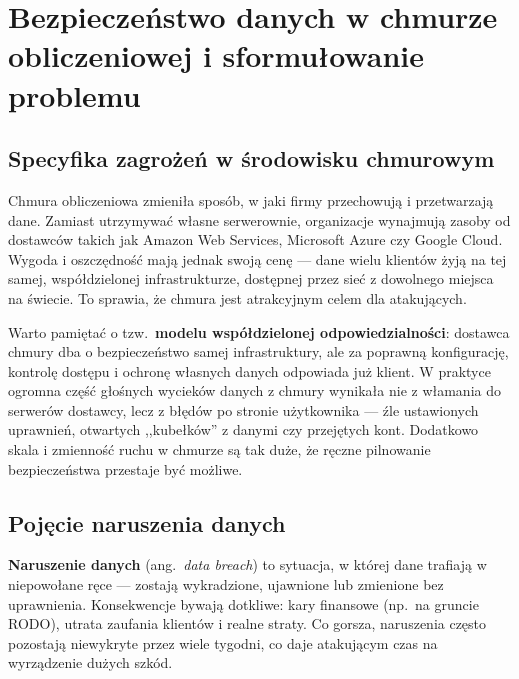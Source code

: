 \section{Bezpieczeństwo danych w chmurze obliczeniowej i sformułowanie problemu}
\label{sec:problem}

\subsection{Specyfika zagrożeń w środowisku chmurowym}

Chmura obliczeniowa zmieniła sposób, w jaki firmy przechowują i przetwarzają
dane. Zamiast utrzymywać własne serwerownie, organizacje wynajmują zasoby od
dostawców takich jak Amazon Web Services, Microsoft Azure czy Google Cloud.
Wygoda i oszczędność mają jednak swoją cenę --- dane wielu klientów żyją na tej
samej, współdzielonej infrastrukturze, dostępnej przez sieć z dowolnego miejsca
na świecie. To sprawia, że chmura jest atrakcyjnym celem dla atakujących.

Warto pamiętać o tzw.\ \textbf{modelu współdzielonej odpowiedzialności}: dostawca
chmury dba o bezpieczeństwo samej infrastruktury, ale za poprawną konfigurację,
kontrolę dostępu i ochronę własnych danych odpowiada już klient. W praktyce
ogromna część głośnych wycieków danych z chmury wynikała nie z włamania do
serwerów dostawcy, lecz z błędów po stronie użytkownika --- źle ustawionych
uprawnień, otwartych ,,kubełków'' z danymi czy przejętych kont. Dodatkowo skala
i zmienność ruchu w chmurze są tak duże, że ręczne pilnowanie bezpieczeństwa
przestaje być możliwe.

\subsection{Pojęcie naruszenia danych}

\textbf{Naruszenie danych} (ang.\ \emph{data breach}) to sytuacja, w której
dane trafiają w niepowołane ręce --- zostają wykradzione, ujawnione lub zmienione
bez uprawnienia. Konsekwencje bywają dotkliwe: kary finansowe (np.\ na gruncie
RODO), utrata zaufania klientów i realne straty. Co gorsza, naruszenia często
pozostają niewykryte przez wiele tygodni, co daje atakującym czas na wyrządzenie
dużych szkód.

